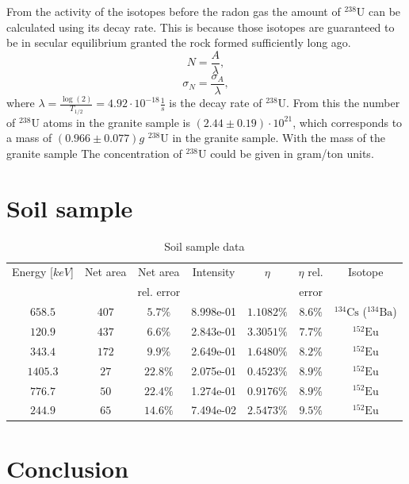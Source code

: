 \documentclass[pdftex,12pt,a4paper]{article}
\begin{document}
		From the activity of the isotopes before the radon gas the amount of $^{238}\text{U}$ can be calculated using its decay rate. This is because those isotopes are guaranteed to be in secular equilibrium granted the rock formed sufficiently long ago.
		\begin{equation}
			N = \frac{A}{\lambda},
		\end{equation}
		\begin{equation}
			\sigma_N = \frac{\sigma_A}{\lambda},
		\end{equation}
		where $\lambda = \frac{\log(2)}{T_{1/2}} = 4.92\cdot 10^{-18}\frac{1}{s}$ is the decay rate of $^{238}\text{U}$. From this the number of $^{238}\text{U}$ atoms in the granite sample is $(2.44\pm0.19)\cdot 10^{21}$, which corresponds to a mass of $(0.966\pm0.077)g$ $^{238}\text{U}$ in the granite sample. With the mass of the granite sample The concentration of $^{238}\text{U}$ could be given in gram/ton units.
	\section{Soil sample}
		\begin{table}[H]
		\centering
		\begin{tabular}{|c|c|c|c|c|c|c|}
			\hline
			Energy [$keV$] & Net area & Net area   & Intensity & $\eta$ & $\eta$ rel. & Isotope \\
			               &          & rel. error &           &        & error       &         \\
			\hline
            $658.5$ & $407$ & $5.7\%$ & 8.998e-01 & $1.1082\%$ & $8.6\%$ & $^{134}\text{Cs}$ ($^{134}\text{Ba}$) \\
            $120.9$ & $437$ & $6.6\%$ & 2.843e-01 & $3.3051\%$ & $7.7\%$ & $^{152}\text{Eu}$ \\
            $343.4$ & $172$ & $9.9\%$ & 2.649e-01 & $1.6480\%$ & $8.2\%$ & $^{152}\text{Eu}$ \\
            $1405.3$ & $27$ & $22.8\%$ & 2.075e-01 & $0.4523\%$ & $8.9\%$ & $^{152}\text{Eu}$ \\
            $776.7$ & $50$ & $22.4\%$ & 1.274e-01 & $0.9176\%$ & $8.9\%$ & $^{152}\text{Eu}$ \\
            $244.9$ & $65$ & $14.6\%$ & 7.494e-02 & $2.5473\%$ & $9.5\%$ & $^{152}\text{Eu}$ \\
			\hline
		\end{tabular}
		\caption{Soil sample data}
		\end{table}
	\section{Conclusion}
	
    
\end{document}
